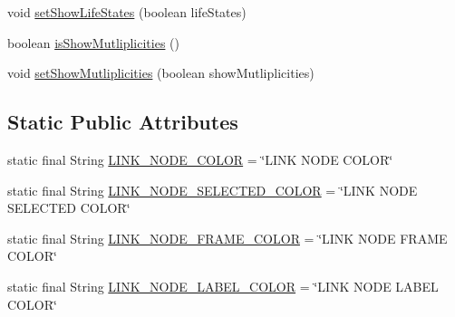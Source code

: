 \begin{DoxyCompactItemize}
\item 
void \hyperlink{classorg_1_1tzi_1_1use_1_1gui_1_1views_1_1diagrams_1_1behavior_1_1communicationdiagram_1_1_communication_diagram_options_a4a39cf3e3eaee08aa6e91c2e0afa40bd}{set\-Show\-Life\-States} (boolean life\-States)
\item 
boolean \hyperlink{classorg_1_1tzi_1_1use_1_1gui_1_1views_1_1diagrams_1_1behavior_1_1communicationdiagram_1_1_communication_diagram_options_a88df555332fb166452785a875e12c222}{is\-Show\-Mutliplicities} ()
\item 
void \hyperlink{classorg_1_1tzi_1_1use_1_1gui_1_1views_1_1diagrams_1_1behavior_1_1communicationdiagram_1_1_communication_diagram_options_a81a1eb1a50ef861c337c3f6d1acef97c}{set\-Show\-Mutliplicities} (boolean show\-Mutliplicities)
\end{DoxyCompactItemize}
\subsection*{Static Public Attributes}
\begin{DoxyCompactItemize}
\item 
static final String \hyperlink{classorg_1_1tzi_1_1use_1_1gui_1_1views_1_1diagrams_1_1behavior_1_1communicationdiagram_1_1_communication_diagram_options_a810ac7d4e4a1fb9c48e6e34dc4074b8a}{L\-I\-N\-K\-\_\-\-N\-O\-D\-E\-\_\-\-C\-O\-L\-O\-R} = \char`\"{}L\-I\-N\-K N\-O\-D\-E C\-O\-L\-O\-R\char`\"{}
\item 
static final String \hyperlink{classorg_1_1tzi_1_1use_1_1gui_1_1views_1_1diagrams_1_1behavior_1_1communicationdiagram_1_1_communication_diagram_options_a4ffcbd4917cf3dd4405b82b99d6eb418}{L\-I\-N\-K\-\_\-\-N\-O\-D\-E\-\_\-\-S\-E\-L\-E\-C\-T\-E\-D\-\_\-\-C\-O\-L\-O\-R} = \char`\"{}L\-I\-N\-K N\-O\-D\-E S\-E\-L\-E\-C\-T\-E\-D C\-O\-L\-O\-R\char`\"{}
\item 
static final String \hyperlink{classorg_1_1tzi_1_1use_1_1gui_1_1views_1_1diagrams_1_1behavior_1_1communicationdiagram_1_1_communication_diagram_options_a8c59b8d8f8c52a8b38ce3b6344d02867}{L\-I\-N\-K\-\_\-\-N\-O\-D\-E\-\_\-\-F\-R\-A\-M\-E\-\_\-\-C\-O\-L\-O\-R} = \char`\"{}L\-I\-N\-K N\-O\-D\-E F\-R\-A\-M\-E C\-O\-L\-O\-R\char`\"{}
\item 
static final String \hyperlink{classorg_1_1tzi_1_1use_1_1gui_1_1views_1_1diagrams_1_1behavior_1_1communicationdiagram_1_1_communication_diagram_options_ab1f76fc4fcb8a458167284fc54b6a68b}{L\-I\-N\-K\-\_\-\-N\-O\-D\-E\-\_\-\-L\-A\-B\-E\-L\-\_\-\-C\-O\-L\-O\-R} = \char`\"{}L\-I\-N\-K N\-O\-D\-E L\-A\-B\-E\-L C\-O\-L\-O\-R\char`\"{}
\end{DoxyCompactItemize}
